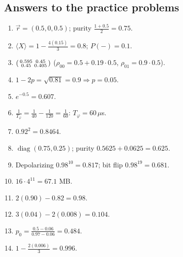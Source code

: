 \documentclass[11pt,a4paper,openany]{book}
\begin{document}
\subsection*{Answers to the practice problems}
\begin{enumerate}[label=\textbf{P\arabic*.}, leftmargin=2.6em, itemsep=3pt]
\item $\vec r = (0.5, 0, 0.5)$; purity $\frac{1 + 0.5}{2} = 0.75$.
\item $\langle X\rangle = 1 - \frac{4(0.15)}{3} = 0.8$; $P(-) = 0.1$.
\item $\begin{psmallmatrix}0.595 & 0.45\\ 0.45 & 0.405\end{psmallmatrix}$ ($\rho_{00} = 0.5 + 0.19\cdot0.5$, $\rho_{01} = 0.9\cdot0.5$).
\item $1 - 2p = \sqrt{0.81} = 0.9 \Rightarrow p = 0.05$.
\item $e^{-0.5} = 0.607$.
\item $\frac1{T_\varphi} = \frac1{40} - \frac1{120} = \frac1{60}$: $T_\varphi = 60\,\mu$s.
\item $0.92^2 = 0.8464$.
\item $\operatorname{diag}(0.75, 0.25)$; purity $0.5625 + 0.0625 = 0.625$.
\item Depolarizing $0.98^{10} = 0.817$; bit flip $0.98^{19} = 0.681$.
\item $16\cdot4^{11} = 67.1$ MB.
\item $2(0.90) - 0.82 = 0.98$.
\item $3(0.04) - 2(0.008) = 0.104$.
\item $p_0 = \frac{0.5 - 0.06}{0.97 - 0.06} = 0.484$.
\item $1 - \frac{2(0.006)}{3} = 0.996$.
\end{enumerate}
\end{document}
